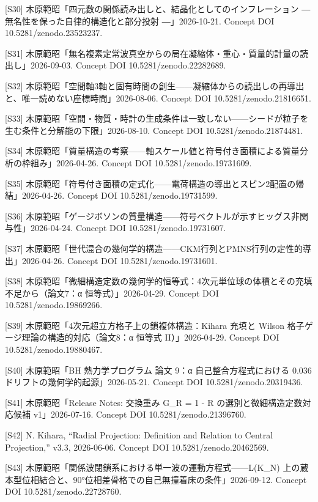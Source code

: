 \documentclass[
  a4paper,
]{ltjsarticle}
\begin{document}
{[}S30{]}
木原範昭「四元数の関係読み出しと、結晶化としてのインフレーション ―
無名性を保った自律的構造化と部分投射 ―」2026-10-21. Concept DOI
10.5281/zenodo.23523237.

{[}S31{]}
木原範昭「無名複素定常波真空からの局在凝縮体・重心・質量的計量の読出し」2026-09-03.
Concept DOI 10.5281/zenodo.22282689.

{[}S32{]}
木原範昭「空間軸3軸と固有時間の創生------凝縮体からの読出しの再導出と、唯一読めない座標時間」2026-08-06.
Concept DOI 10.5281/zenodo.21816651.

{[}S33{]}
木原範昭「空間・物質・時計の生成条件は一致しない------シードが粒子を生む条件と分解能の下限」2026-08-10.
Concept DOI 10.5281/zenodo.21874481.

{[}S34{]}
木原範昭「質量構造の考察------軸スケール値と符号付き面積による質量分析の枠組み」2026-04-26.
Concept DOI 10.5281/zenodo.19731609.

{[}S35{]}
木原範昭「符号付き面積の定式化------電荷構造の導出とスピン2配置の帰結」2026-04-26.
Concept DOI 10.5281/zenodo.19731599.

{[}S36{]}
木原範昭「ゲージボソンの質量構造------符号ベクトルが示すヒッグス非関与性」2026-04-24.
Concept DOI 10.5281/zenodo.19731607.

{[}S37{]}
木原範昭「世代混合の幾何学的構造------CKM行列とPMNS行列の定性的導出」2026-04-26.
Concept DOI 10.5281/zenodo.19731601.

{[}S38{]}
木原範昭「微細構造定数の幾何学的恒等式：4次元単位球の体積とその充填不足から（論文7：α
恒等式）」2026-04-29. Concept DOI 10.5281/zenodo.19869266.

{[}S39{]} 木原範昭「4次元超立方格子上の鎖複体構造：Kihara 充填と Wilson
格子ゲージ理論の構造的対応（論文8：α 恒等式 II）」2026-04-29. Concept
DOI 10.5281/zenodo.19880467.

{[}S40{]} 木原範昭「BH 熱力学プログラム 論文 9：α 自己整合方程式における
0.036 ドリフトの幾何学的起源」2026-05-21. Concept DOI
10.5281/zenodo.20319436.

{[}S41{]} 木原範昭「Release Notes: 交換重み G\_R = 1 - R
の選別と微細構造定数対応候補 v1」2026-07-16. Concept DOI
10.5281/zenodo.21396760.

{[}S42{]} N. Kihara, ``Radial Projection: Definition and Relation to
Central Projection,'' v3.3, 2026-06-06. Concept DOI
10.5281/zenodo.20462569.

{[}S43{]} 木原範昭「関係波閉鎖系における単一波の運動方程式------L(K\_N)
上の蔵本型位相結合と、90°位相差骨格での自己無撞着床の条件」2026-09-12.
Concept DOI 10.5281/zenodo.22728760.
\end{document}
